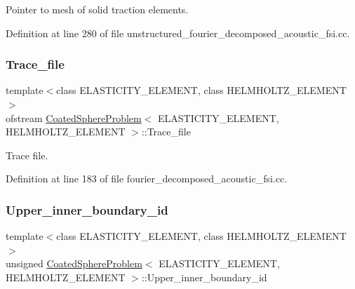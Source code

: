Pointer to mesh of solid traction elements. 



Definition at line 280 of file unstructured\+\_\+fourier\+\_\+decomposed\+\_\+acoustic\+\_\+fsi.\+cc.

\mbox{\label{classCoatedSphereProblem_a79847476b26744153c0359041a52a270}} 
\subsubsection{\texorpdfstring{Trace\+\_\+file}{Trace\_file}}
{\footnotesize\ttfamily template$<$class E\+L\+A\+S\+T\+I\+C\+I\+T\+Y\+\_\+\+E\+L\+E\+M\+E\+NT, class H\+E\+L\+M\+H\+O\+L\+T\+Z\+\_\+\+E\+L\+E\+M\+E\+NT$>$ \\
ofstream \hyperlink{classCoatedSphereProblem}{Coated\+Sphere\+Problem}$<$ E\+L\+A\+S\+T\+I\+C\+I\+T\+Y\+\_\+\+E\+L\+E\+M\+E\+NT, H\+E\+L\+M\+H\+O\+L\+T\+Z\+\_\+\+E\+L\+E\+M\+E\+NT $>$\+::Trace\+\_\+file\hspace{0.3cm}{\ttfamily [private]}}



Trace file. 



Definition at line 183 of file fourier\+\_\+decomposed\+\_\+acoustic\+\_\+fsi.\+cc.

\mbox{\label{classCoatedSphereProblem_abdd54d39d9757a4da7d2eb56bab1c392}} 
\subsubsection{\texorpdfstring{Upper\+\_\+inner\+\_\+boundary\+\_\+id}{Upper\_inner\_boundary\_id}}
{\footnotesize\ttfamily template$<$class E\+L\+A\+S\+T\+I\+C\+I\+T\+Y\+\_\+\+E\+L\+E\+M\+E\+NT, class H\+E\+L\+M\+H\+O\+L\+T\+Z\+\_\+\+E\+L\+E\+M\+E\+NT$>$ \\
unsigned \hyperlink{classCoatedSphereProblem}{Coated\+Sphere\+Problem}$<$ E\+L\+A\+S\+T\+I\+C\+I\+T\+Y\+\_\+\+E\+L\+E\+M\+E\+NT, H\+E\+L\+M\+H\+O\+L\+T\+Z\+\_\+\+E\+L\+E\+M\+E\+NT $>$\+::Upper\+\_\+inner\+\_\+boundary\+\_\+id\hspace{0.3cm}{\ttfamily [private]}}



